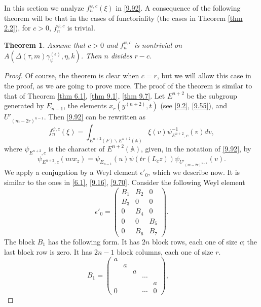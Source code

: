 \documentclass[12pts]{amsart}
\newcommand{\BA}{{\mathbb {A}}}
\newtheorem{thm}{Theorem}[section]
\begin{document}
In this section we analyze $f_n^{\psi,c}(\xi)$ in \eqref{9.92}. A consequence of the following theorem will be that in the cases of functoriality (the cases in Theorem \ref{thm 2.2}), for $c>0$, $f_n^{\psi,c}$ is trivial.

\begin{thm}\label{thm 10.1}
Assume that $c>0$ and $f_n^{\psi,c}$  is nontrivial on $A(\Delta(\tau,m)\gamma_\psi^{(\epsilon)},\eta,k)$. Then $n$ divides $r-c$.
\end{thm}
\begin{proof}
Of course, the theorem is clear when $c=r$, but we will allow this case in the proof, as we are going to prove more. The proof of the theorem is similar to that of Theorem \ref{thm 6.1}, \ref{thm 9.1}, \ref{thm 9.7}. 
Let $E^{n+2}$ be the subgroup generated by $E_{n-1}$, the elements $x_r(y^{(n+2)},t)$ (see \eqref{9.2}, \eqref{9.55}), and $U'_{(m-2r)^{n-1}}$. Then \eqref{9.92} can be rewritten as
\begin{equation}\label{10.5}
f_n^{\psi,c}(\xi)=\int_{E^{n+2}(F)\backslash E^{n+2}(\BA)}\xi(v)\psi^{-1}_{E^{n+2},c}(v)dv,
\end{equation}
where $\psi_{E^{n+2},c}$ is the character of $E^{n+2}(\BA)$, given, in the notation of \eqref{9.92}, by 
$$
\psi_{E^{n+2},c}(uvx_z)=\psi_{E_{n-1}}(u)\psi(tr(L_cz))\psi_{U'_{(m-2r)^{n-1}}}(v).
$$
We apply a conjugation by a Weyl element $\epsilon'_0$, which we describe now. It is similar to the ones in \eqref{6.1}, \eqref{9.16}, \eqref{9.70}.
Consider the following Weyl element	
\begin{equation}\label{10.1}
\epsilon'_0=\begin{pmatrix}B_1&B_2&0\\B_3&0&0\\0&B_4&0\\0&0&B_5\\0&B_6&B_7\end{pmatrix}.
\end{equation}
The block $B_1$ has the following form. It has $2n$ block rows,
each one of size $c$; the last block row is zero. It has
$2n-1$ block columns, each one of size $r$.
\begin{equation}\label{10.2}
B_1=\begin{pmatrix}a\\&a\\&&a\\&&&\cdots\\&&&&a\\0&&&\cdots
&0\end{pmatrix},\quad

\end{equation}
\end{proof}
\end{document}
